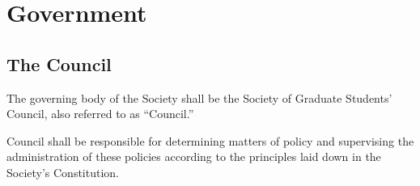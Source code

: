 \newpage

\section{Government}
\subsection{The Council}
	\begin{longenum}[label*=\thesubsection.\arabic*., align=left]
	\item The governing body of the Society shall be the Society of Graduate Students' Council, also referred to as ``Council.''
	
	\item Council shall be responsible for determining matters of policy and supervising the administration of these policies according to the principles laid down in the Society's Constitution. 
    

\end{longenum}
